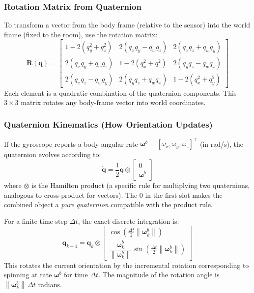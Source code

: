 \documentclass[11pt,a4paper]{article}
\newcommand{\vect}[1]{\bm{#1}}
\newcommand{\mat}[1]{\mathbf{#1}}
\newcommand{\norm}[1]{\left\|#1\right\|}
\newcommand{\Trans}{^{\top}}
\begin{document}
\subsubsection{Rotation Matrix from Quaternion}

To transform a vector from the body frame (relative to the sensor) into the world frame (fixed to the room), use the rotation matrix:
\begin{equation}
\mat{R}(\vect{q}) = \begin{bmatrix}
1 - 2(q_y^2 + q_z^2) & 2(q_x q_y - q_w q_z) & 2(q_x q_z + q_w q_y) \\
2(q_x q_y + q_w q_z) & 1 - 2(q_x^2 + q_z^2) & 2(q_y q_z - q_w q_x) \\
2(q_x q_z - q_w q_y) & 2(q_y q_z + q_w q_x) & 1 - 2(q_x^2 + q_y^2)
\end{bmatrix}
\end{equation}
Each element is a quadratic combination of the quaternion components. This $3\times3$ matrix rotates any body-frame vector into world coordinates.

\subsubsection{Quaternion Kinematics (How Orientation Updates)}

If the gyroscope reports a body angular rate $\vect{\omega}^b = [\omega_x, \omega_y, \omega_z]\Trans$ (in rad/s), the quaternion evolves according to:
\begin{equation}
\dot{\vect{q}} = \frac{1}{2} \vect{q} \otimes \begin{bmatrix}0 \\ \vect{\omega}^b\end{bmatrix}
\label{eq:qdot}
\end{equation}
where $\otimes$ is the Hamilton product (a specific rule for multiplying two quaternions, analogous to cross-product for vectors). The $0$ in the first slot makes the combined object a \emph{pure quaternion} compatible with the product rule.

For a finite time step $\Delta t$, the exact discrete integration is:
\begin{equation}
\vect{q}_{k+1} = \vect{q}_k \otimes \begin{bmatrix}\cos\!\left(\tfrac{\Delta t}{2}\norm{\vect{\omega}^b_k}\right) \\[4pt] \dfrac{\vect{\omega}^b_k}{\norm{\vect{\omega}^b_k}}\sin\!\left(\tfrac{\Delta t}{2}\norm{\vect{\omega}^b_k}\right)\end{bmatrix}
\label{eq:qprop}
\end{equation}
This rotates the current orientation by the incremental rotation corresponding to spinning at rate $\vect{\omega}^b$ for time $\Delta t$. The magnitude of the rotation angle is $\norm{\vect{\omega}^b_k}\,\Delta t$ radians.
\end{document}
